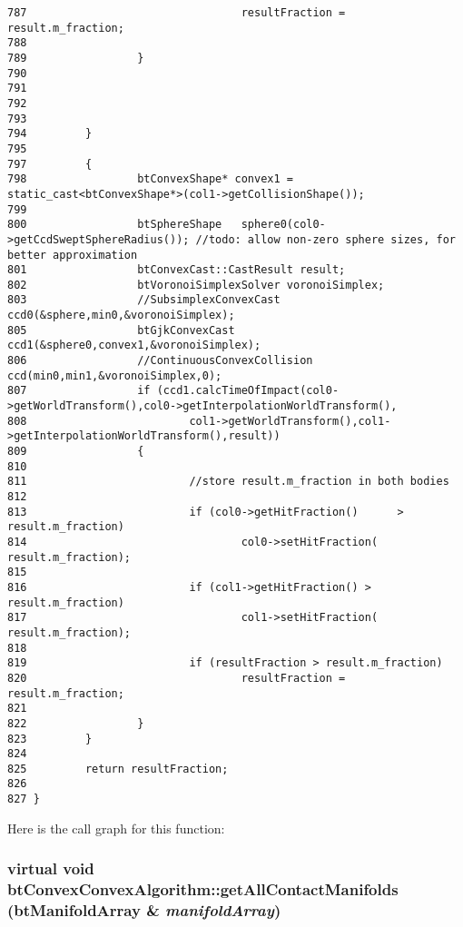 \begin{Code}
\begin{verbatim}
787                                 resultFraction = result.m_fraction;
788 
789                 }
790                 
791                 
792 
793 
794         }
795 
797         {
798                 btConvexShape* convex1 = static_cast<btConvexShape*>(col1->getCollisionShape());
799 
800                 btSphereShape   sphere0(col0->getCcdSweptSphereRadius()); //todo: allow non-zero sphere sizes, for better approximation
801                 btConvexCast::CastResult result;
802                 btVoronoiSimplexSolver voronoiSimplex;
803                 //SubsimplexConvexCast ccd0(&sphere,min0,&voronoiSimplex);
805                 btGjkConvexCast ccd1(&sphere0,convex1,&voronoiSimplex);
806                 //ContinuousConvexCollision ccd(min0,min1,&voronoiSimplex,0);
807                 if (ccd1.calcTimeOfImpact(col0->getWorldTransform(),col0->getInterpolationWorldTransform(),
808                         col1->getWorldTransform(),col1->getInterpolationWorldTransform(),result))
809                 {
810                 
811                         //store result.m_fraction in both bodies
812                 
813                         if (col0->getHitFraction()      > result.m_fraction)
814                                 col0->setHitFraction( result.m_fraction);
815 
816                         if (col1->getHitFraction() > result.m_fraction)
817                                 col1->setHitFraction( result.m_fraction);
818 
819                         if (resultFraction > result.m_fraction)
820                                 resultFraction = result.m_fraction;
821 
822                 }
823         }
824         
825         return resultFraction;
826 
827 }
\end{verbatim}
\end{Code}




Here is the call graph for this function:\hypertarget{classbt_convex_convex_algorithm_a2a195cdd3b45c169c15ea2de85c4038}{
\subsubsection[getAllContactManifolds]{\setlength{\rightskip}{0pt plus 5cm}virtual void btConvexConvexAlgorithm::getAllContactManifolds ({\bf btManifoldArray} \& {\em manifoldArray})}}
\label{classbt_convex_convex_algorithm_a2a195cdd3b45c169c15ea2de85c4038}




